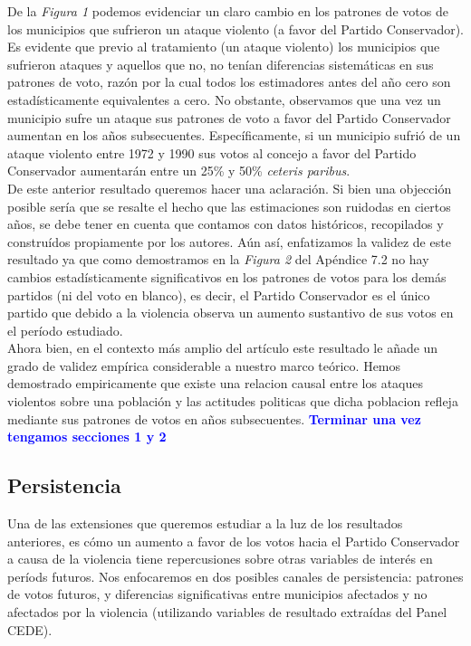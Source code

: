 \documentclass[a4paper]{article}
\begin{document}
De la \textit{Figura 1} podemos evidenciar un claro cambio en los patrones de votos de los municipios que sufrieron un ataque violento (a favor del Partido Conservador). Es evidente que previo al tratamiento (un ataque violento) los municipios que sufrieron ataques y aquellos que no, no tenían diferencias sistemáticas en sus patrones de voto, razón por la cual todos los estimadores antes del año cero son estadísticamente equivalentes a cero. No obstante, observamos que una vez un municipio sufre un ataque sus patrones de voto a favor del Partido Conservador aumentan en los años subsecuentes. Específicamente, si un municipio sufrió de un ataque violento entre 1972 y 1990 sus votos al concejo a favor del Partido Conservador aumentarán entre un 25\% y 50\% \textit{ceteris paribus}. \\

De este anterior resultado queremos hacer una aclaración. Si bien una objección posible sería que se resalte el hecho que las estimaciones son ruidodas en ciertos años, se debe tener en cuenta que contamos con datos históricos, recopilados y construídos propiamente por los autores. Aún así, enfatizamos la validez de este resultado ya que como demostramos en la \textit{Figura 2} del Apéndice 7.2 no hay cambios estadísticamente significativos en los patrones de votos para los demás partidos (ni del voto en blanco), es decir, el Partido Conservador es el único partido que debido a la violencia observa un aumento sustantivo de sus votos en el período estudiado. \\

Ahora bien, en el contexto más amplio del artículo este resultado le añade un grado de validez empírica considerable a nuestro marco teórico. Hemos demostrado empiricamente que existe una relacion causal entre los ataques violentos sobre una población y las actitudes politicas que dicha poblacion refleja mediante sus patrones de votos en años subsecuentes. \textbf{\textcolor{blue}{Terminar una vez tengamos secciones 1 y 2}}

\subsection{Persistencia}
Una de las extensiones que queremos estudiar a la luz de los resultados anteriores, es cómo un aumento a favor de los votos hacia el Partido Conservador a causa de la violencia tiene repercusiones sobre otras variables de interés en períods futuros. Nos enfocaremos en dos posibles canales de persistencia: patrones de votos futuros, y diferencias significativas entre municipios afectados y no afectados por la violencia (utilizando variables de resultado extraídas del Panel CEDE).
\end{document}
